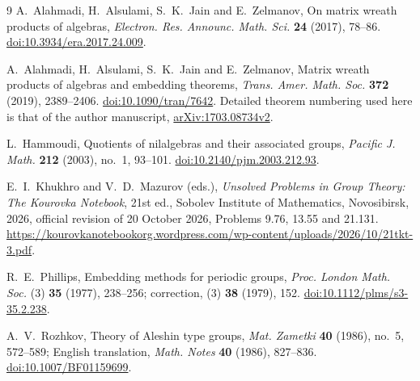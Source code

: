 \documentclass[11pt]{article}
\theoremstyle{definition}
\begin{document}
\begin{thebibliography}{9}
A.~Alahmadi, H.~Alsulami, S.~K.~Jain and E.~Zelmanov,
On matrix wreath products of algebras,
\emph{Electron. Res. Announc. Math. Sci.} \textbf{24} (2017), 78--86.
\href{https://doi.org/10.3934/era.2017.24.009}{doi:10.3934/era.2017.24.009}.

A.~Alahmadi, H.~Alsulami, S.~K.~Jain and E.~Zelmanov,
Matrix wreath products of algebras and embedding theorems,
\emph{Trans. Amer. Math. Soc.} \textbf{372} (2019), 2389--2406.
\href{https://doi.org/10.1090/tran/7642}{doi:10.1090/tran/7642}.
Detailed theorem numbering used here is that of the author manuscript,
\href{https://arxiv.org/abs/1703.08734v2}{arXiv:1703.08734v2}.

L.~Hammoudi, Quotients of nilalgebras and their associated groups,
\emph{Pacific J. Math.} \textbf{212} (2003), no.~1, 93--101.
\href{https://doi.org/10.2140/pjm.2003.212.93}{doi:10.2140/pjm.2003.212.93}.

E.~I.~Khukhro and V.~D.~Mazurov (eds.),
\emph{Unsolved Problems in Group Theory: The Kourovka Notebook},
21st ed., Sobolev Institute of Mathematics, Novosibirsk, 2026,
official revision of 20 October 2026, Problems 9.76, 13.55 and 21.131.
\url{https://kourovkanotebookorg.wordpress.com/wp-content/uploads/2026/10/21tkt-3.pdf}.

R.~E.~Phillips, Embedding methods for periodic groups,
\emph{Proc. London Math. Soc.} (3) \textbf{35} (1977), 238--256;
correction, (3) \textbf{38} (1979), 152.
\href{https://doi.org/10.1112/plms/s3-35.2.238}{doi:10.1112/plms/s3-35.2.238}.

A.~V.~Rozhkov, Theory of Aleshin type groups,
\emph{Mat. Zametki} \textbf{40} (1986), no.~5, 572--589;
English translation, \emph{Math. Notes} \textbf{40} (1986), 827--836.
\href{https://doi.org/10.1007/BF01159699}{doi:10.1007/BF01159699}.
\end{thebibliography}
\end{document}
